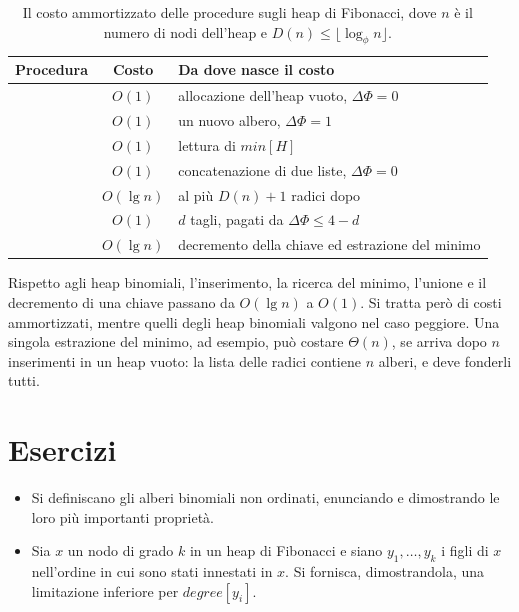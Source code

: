 \begin{table}[htbp]
\centering
\small
\begin{tabular}{lcl}
\toprule
Procedura & Costo & Da dove nasce il costo \\
\midrule
\MakeFibHeap{} & $O(1)$ & allocazione dell'heap vuoto, $\Delta\Phi = 0$ \\
\FibHeapInsert{} & $O(1)$ & un nuovo albero, $\Delta\Phi = 1$ \\
\Minimum{} & $O(1)$ & lettura di $\mathit{min}[H]$ \\
\FibHeapUnion{} & $O(1)$ & concatenazione di due liste, $\Delta\Phi = 0$ \\
\FibHeapExtractMin{} & $O(\lg n)$ & al più $D(n) + 1$ radici dopo \Consolidate{} \\
\FibHeapDecreaseKey{} & $O(1)$ & $d$ tagli, pagati da $\Delta\Phi \le 4 - d$ \\
\FibHeapDelete{} & $O(\lg n)$ & decremento della chiave ed estrazione del minimo \\
\bottomrule
\end{tabular}
\caption{Il costo ammortizzato delle procedure sugli heap di Fibonacci, dove $n$ è il numero di nodi dell'heap e $D(n) \le \lfloor \log_\phi n \rfloor$.}
\label{tab:hf-costi}
\end{table}

Rispetto agli heap binomiali, l'inserimento, la ricerca del minimo, l'unione e il decremento di una chiave passano da $O(\lg n)$ a $O(1)$. Si tratta però di costi ammortizzati, mentre quelli degli heap binomiali valgono nel caso peggiore. Una singola estrazione del minimo, ad esempio, può costare $\Theta(n)$, se arriva dopo $n$ inserimenti in un heap vuoto: la lista delle radici contiene $n$ alberi, e \Consolidate{} deve fonderli tutti.

\section{Esercizi}\label{sec:hf-esercizi}
\begin{esercizio}\label{es:hf-2025}
\begin{itemize}
    \item[(a)] Si definiscano gli alberi binomiali non ordinati, enunciando e dimostrando le loro più importanti proprietà.
    \item[(b)] Sia $x$ un nodo di grado $k$ in un heap di Fibonacci e siano $y_1, \ldots, y_k$ i figli di $x$ nell'ordine in cui sono stati innestati in $x$. Si fornisca, dimostrandola, una limitazione inferiore per $\mathit{degree}[y_i]$.
\end{itemize}
\end{esercizio}

